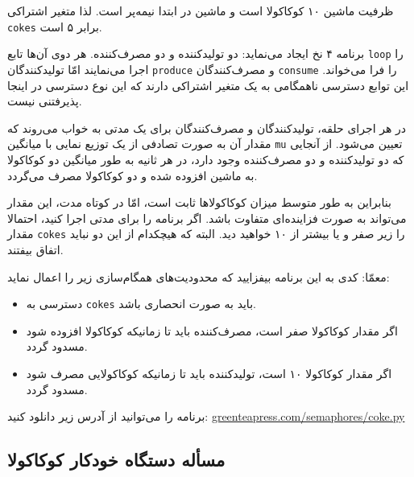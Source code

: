 \documentclass{book}
\newcommand{\clearemptydoublepage}{\newpage\cleardoublepage}
\begin{document}
    ظرفیت ماشین ۱۰ کوکاکولا است و ماشین در ابتدا نیمه‌پر است. لذا متغیر اشتراکی {\tt cokes} برابر ۵ است. 

    برنامه ۴ نخ ایجاد می‌نماید: دو تولیدکننده و دو مصرف‌کننده. 
    هر دوی آن‌ها تابع {\tt loop} را اجرا می‌نمایند امّا تولیدکنندگان  {\tt produce}  و مصرف‌کنندگان {\tt consume} را فرا می‌خواند. 
    این توابع دسترسی ناهمگامی به یک متغیر اشتراکی دارند که این نوع دسترسی در اینجا پذیرفتنی نیست. 

    در هر اجرای حلقه، تولیدکنندگان و مصرف‌کنندگان برای یک مدتی به خواب می‌روند که مقدار آن به صورت تصادفی 
    از یک توزیع نمایی با میانگین  {\tt mu} تعیین می‌شود. از آنجایی که دو تولیدکننده و دو مصرف‌کننده وجود دارد، در هر ثانیه به طور میانگین 
    دو کوکاکولا به ماشین افزوده شده و دو کوکاکولا مصرف می‌گردد. 

    بنابراین به طور متوسط میزان کوکاکولاها ثابت است، امّا در کوتاه مدت، این مقدار می‌تواند به صورت فزاینده‌ای متفاوت باشد.
    اگر برنامه را برای مدتی اجرا کنید، احتمالا مقدار  {\tt cokes}  را زیر صفر و یا بیشتر از ۱۰ خواهید دید. البته که هیچکدام از این دو نباید اتفاق بیفتند. 
    
    معمّا: کدی به این برنامه بیفزایید که محدودیت‌های همگام‌سازی زیر را اعمال نماید:

\begin{itemize}

\item
    دسترسی به {\tt cokes} باید به صورت انحصاری باشد. 

\item
    اگر مقدار کوکاکولا صفر است، مصرف‌کننده باید تا زمانیکه کوکاکولا افزوده شود مسدود گردد. 

\item
    اگر مقدار کوکاکولا ۱۰ است، تولید‌کننده باید تا زمانیکه کوکاکولایی مصرف شود مسدود گردد. 

\end{itemize}

    برنامه را می‌توانید از آدرس زیر دانلود کنید:
\url{greenteapress.com/semaphores/coke.py}


\clearemptydoublepage
\subsection {مسأله دستگاه خودکار کوکاکولا}
\end{document}
